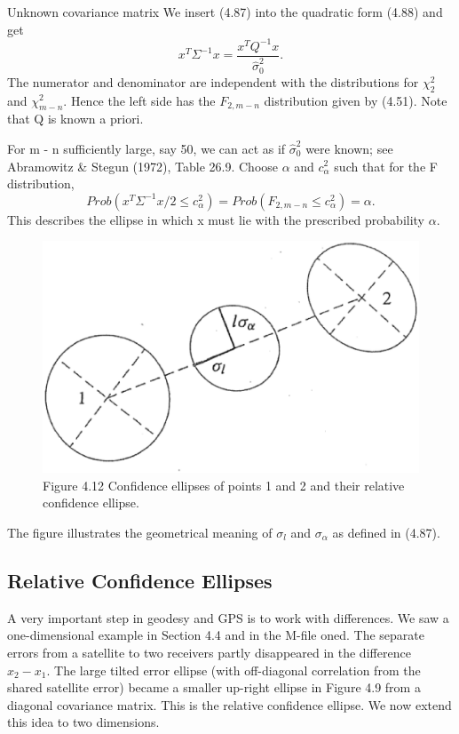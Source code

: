 	Unknown covariance matrix We insert (4.87) into the quadratic form (4.88) and get 
	\begin{equation}
	x^T\Sigma^{-1}x=\frac{x^TQ^{-1}x}{\hat{\sigma}^2_0}.
	\end{equation}
	The numerator and denominator are independent with the distributions for $\chi^2_2$ and
	$\chi^2_{m-n}$. Hence the left side has the $F_{2,m-n}$ distribution given by (4.51). Note that Q is known a
	priori.
	
	For m - n sufficiently large, say 50, we can act as if $\hat{\sigma}^2_0$ were known; see Abramowitz \& Stegun (1972), Table 26.9. Choose $\alpha$ and $c^2_\alpha$ such that for the F distribution,
	\begin{equation*}
	Prob(x^T\Sigma^{-1}x/2\leq c^2_\alpha)=Prob(F_{2,m-n}\leq c^2_\alpha)=\alpha.
	\end{equation*} 
	This describes the ellipse in which x must lie with the prescribed probability $\alpha$.
	
	\begin{figure}[h]
		\centering
		\includegraphics[width=0.7\linewidth]{TeX_files/Part02/chapter04/image/4-12}
		\caption{Figure 4.12\; Confidence ellipses of points 1 and 2 and their relative confidence ellipse.}
		\label{fig:4-12}
	\end{figure}	
	The figure illustrates the geometrical meaning of $\sigma_l$ and $\sigma_\alpha$ as defined in (4.87).
	
	\subsection{Relative Confidence Ellipses}
	A very important step in geodesy and GPS is to work with differences. We saw a one-dimensional example in Section 4.4 and in the M-file oned. The separate errors from a satellite to two receivers partly disappeared in the difference $x_2-x_1$. The large tilted error
	ellipse (with off-diagonal correlation from the shared satellite error) became a smaller up-right ellipse in Figure 4.9 from a diagonal covariance matrix. This is the relative confidence ellipse. We now extend this idea to two dimensions.
	
